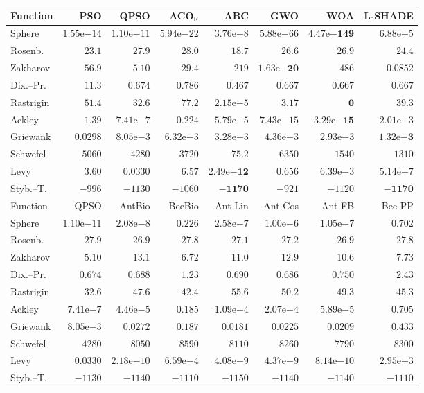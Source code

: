 \begin{tabular}{lrrrrrrr}
\toprule
Function & PSO & QPSO & ACO$_\mathbb{R}$ & ABC & GWO & WOA & L-SHADE \\
\midrule
Sphere & $1.55\mathrm{e}{-14}$ & $1.10\mathrm{e}{-11}$ & $5.94\mathrm{e}{-22}$ & $3.76\mathrm{e}{-8}$ & $5.88\mathrm{e}{-66}$ & $\mathbf{4.47\mathrm{e}{-149}}$ & $6.88\mathrm{e}{-5}$ \\
Rosenb. & $23.1$ & $27.9$ & $28.0$ & $\mathbf{18.7}$ & $26.6$ & $26.9$ & $24.4$ \\
Zakharov & $56.9$ & $5.10$ & $29.4$ & $219$ & $\mathbf{1.63\mathrm{e}{-20}}$ & $486$ & $0.0852$ \\
Dix.--Pr. & $11.3$ & $0.674$ & $0.786$ & $\mathbf{0.467}$ & $0.667$ & $0.667$ & $0.667$ \\
Rastrigin & $51.4$ & $32.6$ & $77.2$ & $2.15\mathrm{e}{-5}$ & $3.17$ & $\mathbf{0}$ & $39.3$ \\
Ackley & $1.39$ & $7.41\mathrm{e}{-7}$ & $0.224$ & $5.79\mathrm{e}{-5}$ & $7.43\mathrm{e}{-15}$ & $\mathbf{3.29\mathrm{e}{-15}}$ & $2.01\mathrm{e}{-3}$ \\
Griewank & $0.0298$ & $8.05\mathrm{e}{-3}$ & $6.32\mathrm{e}{-3}$ & $3.28\mathrm{e}{-3}$ & $4.36\mathrm{e}{-3}$ & $2.93\mathrm{e}{-3}$ & $\mathbf{1.32\mathrm{e}{-3}}$ \\
Schwefel & $5060$ & $4280$ & $3720$ & $\mathbf{75.2}$ & $6350$ & $1540$ & $1310$ \\
Levy & $3.60$ & $0.0330$ & $6.57$ & $\mathbf{2.49\mathrm{e}{-12}}$ & $0.656$ & $6.39\mathrm{e}{-3}$ & $5.14\mathrm{e}{-7}$ \\
Styb.--T. & $-996$ & $-1130$ & $-1060$ & $-\mathbf{1170}$ & $-921$ & $-1120$ & $-\mathbf{1170}$ \\
\midrule
Function & QPSO & AntBio & BeeBio & Ant-Lin & Ant-Cos & Ant-FB & Bee-PP \\
\midrule
Sphere & $1.10\mathrm{e}{-11}$ & $2.08\mathrm{e}{-8}$ & $0.226$ & $2.58\mathrm{e}{-7}$ & $1.00\mathrm{e}{-6}$ & $1.05\mathrm{e}{-7}$ & $0.702$ \\
Rosenb. & $27.9$ & $26.9$ & $27.8$ & $27.1$ & $27.2$ & $26.9$ & $27.8$ \\
Zakharov & $5.10$ & $13.1$ & $6.72$ & $11.0$ & $12.9$ & $10.6$ & $7.73$ \\
Dix.--Pr. & $0.674$ & $0.688$ & $1.23$ & $0.690$ & $0.686$ & $0.750$ & $2.43$ \\
Rastrigin & $32.6$ & $47.6$ & $42.4$ & $55.6$ & $50.2$ & $49.3$ & $45.3$ \\
Ackley & $7.41\mathrm{e}{-7}$ & $4.46\mathrm{e}{-5}$ & $0.185$ & $1.09\mathrm{e}{-4}$ & $2.07\mathrm{e}{-4}$ & $5.89\mathrm{e}{-5}$ & $0.705$ \\
Griewank & $8.05\mathrm{e}{-3}$ & $0.0272$ & $0.187$ & $0.0181$ & $0.0225$ & $0.0209$ & $0.433$ \\
Schwefel & $4280$ & $8050$ & $8590$ & $8110$ & $8260$ & $7790$ & $8300$ \\
Levy & $0.0330$ & $2.18\mathrm{e}{-10}$ & $6.59\mathrm{e}{-4}$ & $4.08\mathrm{e}{-9}$ & $4.37\mathrm{e}{-9}$ & $8.14\mathrm{e}{-10}$ & $2.95\mathrm{e}{-3}$ \\
Styb.--T. & $-1130$ & $-1140$ & $-1110$ & $-1150$ & $-1140$ & $-1140$ & $-1110$ \\
\bottomrule
\end{tabular}
